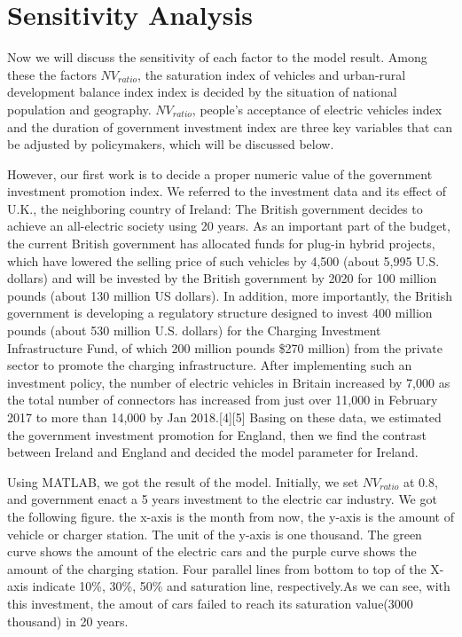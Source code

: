 \documentclass{mcmthesis}
\begin{document}
\par

\section{Sensitivity Analysis}
Now we will discuss the sensitivity of each factor to the model result.
Among these the factors $NV_{ratio}$, the saturation index of vehicles and urban-rural development balance index index is decided by the situation of national population and geography. $NV_{ratio}$, people's acceptance of electric vehicles index and the duration of government investment index are three key variables that can be adjusted by policymakers, which will be discussed below.
\par
However, our first work is to decide a proper numeric value of the government investment promotion index. We referred to the investment data and its effect of U.K., the neighboring country of Ireland: The British government decides to achieve an all-electric society using 20 years. As an important part of the budget, the current British government has allocated funds for plug-in hybrid projects, which have lowered the selling price of such vehicles by 4,500 (about 5,995 U.S. dollars) and will be invested by the British government by 2020 for 100 million pounds (about 130 million US dollars).  In addition, more importantly, the British government is developing a regulatory structure designed to invest 400 million pounds (about 530 million U.S. dollars) for the Charging Investment Infrastructure Fund, of which 200 million pounds \$270 million) from the private sector to promote the charging infrastructure. After implementing such an investment policy, the number of electric vehicles in Britain increased by 7,000 as the total number of connectors has increased from just over 11,000 in February 2017 to more than 14,000 by Jan 2018.[4][5] Basing on these data, we estimated the government investment promotion for England, then we find the contrast between Ireland and England and decided the model parameter for Ireland.
\par
Using MATLAB, we got the result of the model. Initially, we set $NV_{ratio}$ at 0.8, and government enact a 5 years investment to the electric car industry. We got the following figure. the x-axis is the month from now, the y-axis is the amount of vehicle or charger station. The unit of the y-axis is one thousand. The green curve shows the amount of the electric cars and the purple curve shows the amount of the charging station. Four parallel lines from bottom to top of the X-axis indicate 10\%, 30\%, 50\% and saturation line, respectively.As we can see, with this investment, the amout of cars failed to reach its saturation value(3000 thousand) in 20 years. 
\end{document}
